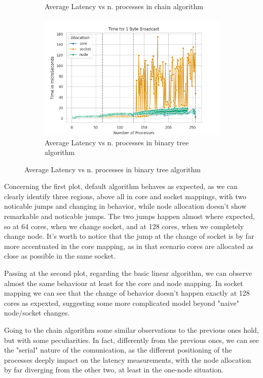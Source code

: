 \documentclass{article}
\begin{document}
\begin{figure}[h]
\begin{subfigure}{0.45\textwidth}
			\caption{Average Latency vs n. processes in chain algorithm}
			\label{fig:bcastchain1byte}
		\end{subfigure}
		\begin{subfigure}{0.45\textwidth}
			\centering
			\includegraphics[width=0.7\linewidth]{../exercise1/plots/bcast_bintree_1byte}
			\caption{Average Latency vs n. processes in binary tree algorithm}
			\label{fig:bcastbintree1byte}
		\end{subfigure}
	\end{figure}
	
	
	
	Concerning the first plot, default algorithm behaves as expected, as we can clearly identify three regions, above all in core and socket mappings, with two noticable jumps and changing in behavior, while node allocation doesn't show remarkable and noticable jumps. The two jumps happen almost where expected, so at 64 cores, when we change socket, and at 128 cores, when we completely change node. It's worth to notice that the jump at the change of socket is by far more accentuated in the core mapping, as in that scenario cores are allocated as close as possible in the same socket. 
	
	Passing at the second plot, regarding the basic linear algorithm, we can observe almost the same behaviour at least for the core and node mapping. In socket mapping we can see that the change of behavior doesn't happen exactly at 128 cores as expexted, suggesting some more complicated model beyond "naive" node/socket changes.
	
	Going to the chain algorithm some similar observations to the previous ones hold, but with some peculiarities.
	In fact, differently from the previous ones, we can see the "serial" nature of the comunication, as the different positioning of the processes deeply impact on the latency measurements, with the node allocation by far diverging from the other two, at least in the one-node situation.
	
\end{document}
